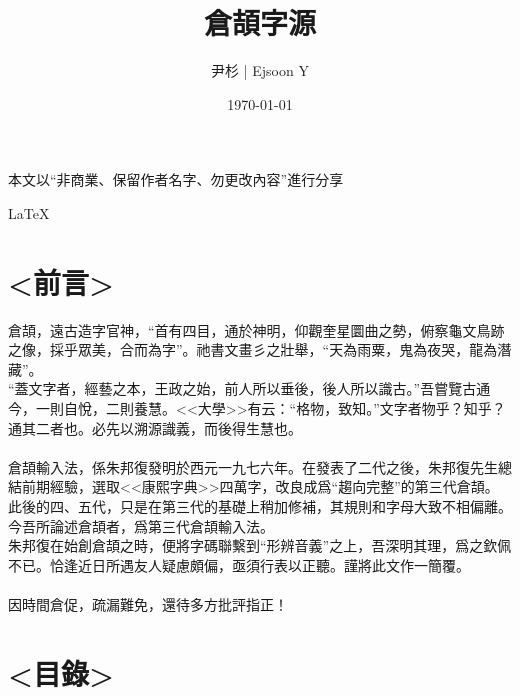 \documentclass{article}
\title{倉頡字源}
\author{尹杉 | Ejsoon Y}
\date{\today}
\begin{document}
\maketitle 
本文以“非商業、保留作者名字、勿更改內容”進行分享


\LaTeX\


\section{<前言>}

倉頡，遠古造字官神，“首有四目，通於神明，仰觀奎星圜曲之勢，俯察龜文鳥跡之像，採乎眾美，合而為字”。祂書文畫彡之壯舉，“天為雨粟，鬼為夜哭，龍為潛藏”。\\
“蓋文字者，經藝之本，王政之始，前人所以垂後，後人所以識古。”吾嘗覽古通今，一則自悅，二則養慧。<<大學>>有云：“格物，致知。”文字者物乎？知乎？通其二者也。必先以溯源識義，而後得生慧也。\\
\\
倉頡輸入法，係朱邦復發明於西元一九七六年。在發表了二代之後，朱邦復先生總結前期經驗，選取<<康熙字典>>四萬字，改良成爲“趨向完整”的第三代倉頡。此後的四、五代，只是在第三代的基礎上稍加修補，其規則和字母大致不相偏離。今吾所論述倉頡者，爲第三代倉頡輸入法。\\
朱邦復在始創倉頡之時，便將字碼聯繫到“形辨音義”之上，吾深明其理，爲之欽佩不已。恰逢近日所遇友人疑慮頗偏，亟須行表以正聽。謹將此文作一簡覆。\\
\\
因時間倉促，疏漏難免，還待多方批評指正！\\



\section{<目錄>}

\tableofcontents

\end{document}
